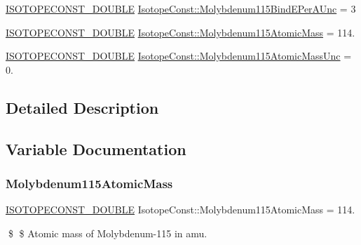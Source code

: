 \begin{DoxyCompactItemize}
\mbox{\hyperlink{group___isotope_const-_macros_ga8f45a7272ce02c0b4c65c44636ed719a}{I\+S\+O\+T\+O\+P\+E\+C\+O\+N\+S\+T\+\_\+\+D\+O\+U\+B\+LE}} \mbox{\hyperlink{group___isotope_const-_molybdenum-_mo115_ga4e8093decaf214aafb67c630fa16e14f}{Isotope\+Const\+::\+Molybdenum115\+Bind\+E\+Per\+A\+Unc}} = 3
\item 
\mbox{\hyperlink{group___isotope_const-_macros_ga8f45a7272ce02c0b4c65c44636ed719a}{I\+S\+O\+T\+O\+P\+E\+C\+O\+N\+S\+T\+\_\+\+D\+O\+U\+B\+LE}} \mbox{\hyperlink{group___isotope_const-_molybdenum-_mo115_gac405411959343c387cee1c45070b903a}{Isotope\+Const\+::\+Molybdenum115\+Atomic\+Mass}} = 114.
\item 
\mbox{\hyperlink{group___isotope_const-_macros_ga8f45a7272ce02c0b4c65c44636ed719a}{I\+S\+O\+T\+O\+P\+E\+C\+O\+N\+S\+T\+\_\+\+D\+O\+U\+B\+LE}} \mbox{\hyperlink{group___isotope_const-_molybdenum-_mo115_ga76ffe4c7e84423c0a4c460ae0f7d9b85}{Isotope\+Const\+::\+Molybdenum115\+Atomic\+Mass\+Unc}} = 0.
\end{DoxyCompactItemize}


\subsection{Detailed Description}


\subsection{Variable Documentation}
\mbox{\label{group___isotope_const-_molybdenum-_mo115_gac405411959343c387cee1c45070b903a}} 
\subsubsection{\texorpdfstring{Molybdenum115\+Atomic\+Mass}{Molybdenum115AtomicMass}}
{\footnotesize\ttfamily \mbox{\hyperlink{group___isotope_const-_macros_ga8f45a7272ce02c0b4c65c44636ed719a}{I\+S\+O\+T\+O\+P\+E\+C\+O\+N\+S\+T\+\_\+\+D\+O\+U\+B\+LE}} Isotope\+Const\+::\+Molybdenum115\+Atomic\+Mass = 114.}

\$ \$ Atomic mass of Molybdenum-\/115 in amu. \mbox{\label{group___isotope_const-_molybdenum-_mo115_ga76ffe4c7e84423c0a4c460ae0f7d9b85}} 
